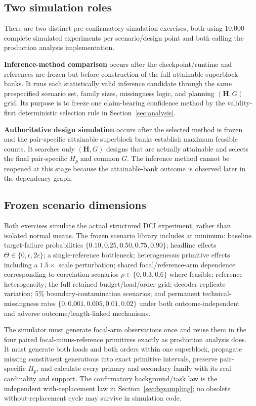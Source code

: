 \documentclass[11pt,a4paper]{article}
\begin{document}
\subsection{Two simulation roles}
There are two distinct pre-confirmatory simulation exercises, both using 10,000 complete simulated experiments per scenario/design point and both calling the production analysis implementation.

\textbf{Inference-method comparison} occurs after the checkpoint/runtime and references are frozen but before construction of the full attainable superblock banks. It runs each statistically valid inference candidate through the same prespecified scenario set, family sizes, missingness logic, and planning $(\mathbf H,G)$ grid. Its purpose is to freeze one claim-bearing confidence method by the validity-first deterministic selection rule in Section~\ref{sec:analysis}.

\textbf{Authoritative design simulation} occurs after the selected method is frozen and the pair-specific attainable superblock banks establish maximum feasible counts. It searches only $(\mathbf H,G)$ designs that are actually attainable and selects the final pair-specific $H_p$ and common $G$. The inference method cannot be reopened at this stage because the attainable-bank outcome is observed later in the dependency graph.

\subsection{Frozen scenario dimensions}
Both exercises simulate the actual structured DCI experiment, rather than isolated normal means. The frozen scenario library includes at minimum: baseline target-failure probabilities $\{0.10,0.25,0.50,0.75,0.90\}$; headline effects $\Theta\in\{0,\epsilon,2\epsilon\}$; a single-reference bottleneck; heterogeneous primitive effects including a $1.5\times$ scale perturbation; shared focal/reference-arm dependence corresponding to correlation scenarios $\rho\in\{0,0.3,0.6\}$ where feasible; reference heterogeneity; the full retained budget/load/order grid; decoder replicate variation; 5\% boundary-contamination scenarios; and permanent technical-missingness rates $\{0,0.001,0.005,0.01,0.02\}$ under both outcome-independent and adverse outcome/length-linked mechanisms.

The simulator must generate focal-arm observations once and reuse them in the four paired focal-minus-reference primitives exactly as production analysis does. It must generate both loads and both orders within one superblock, propagate missing constituent generations into exact primitive intervals, preserve pair-specific $H_p$, and calculate every primary and secondary family with its real cardinality and support. The confirmatory background/task law is the independent with-replacement law in Section~\ref{sec:bgsampling}; no obsolete without-replacement cycle may survive in simulation code.
\end{document}

